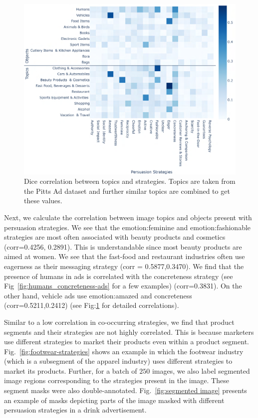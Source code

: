 \begin{figure}[h]
        \centering
        \includegraphics[scale=0.55]{images/objects_topics.pdf}
        \caption{Dice correlation between topics and strategies. Topics are taken from the Pitts Ad dataset and further similar topics are combined to get these values.}
        \label{fig:correlation-between-topics-and-strategies}
    \end{figure}

Next, we calculate the correlation between image topics and objects present with persuasion strategies. We see that the emotion:feminine and emotion:fashionable strategies are most often associated with beauty products and cosmetics (corr=0.4256, 0.2891). This is understandable since most beauty products are aimed at women. We see that the fast-food and restaurant industries often use eagerness as their messaging strategy (corr = 0.5877,0.3470). We find that the presence of humans in ads is correlated with the concreteness strategy (see Fig~\ref{fig:humans_concreteness-ads} for a few examples) (corr=0.3831). On the other hand, vehicle ads use emotion:amazed and concreteness (corr=0.5211,0.2412) (see Fig:\ref{fig:correlation-between-topics-and-strategies} for detailed correlations). 

Similar to a low correlation in co-occurring strategies, we find that product segments and their strategies are not highly correlated. This is because marketers use different strategies to market their products even within a product segment. Fig.~\ref{fig:footwear-strategies} shows an example in which the footwear industry (which is a subsegment of the apparel industry) uses different strategies to market its products. Further, for a batch of $250$ images, we also label segmented image regions corresponding to the strategies present in the image. These segment masks were also double-annotated. Fig.~\ref{fig:segmented image} presents an example of masks depicting parts of the image masked with different persuasion strategies in a drink advertisement.





